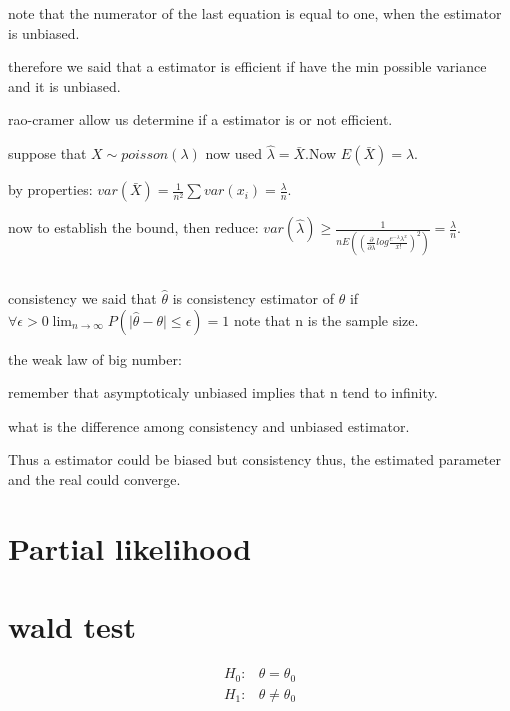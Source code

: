\documentclass[10pt,a4paper]{article}
\begin{document}
note that the numerator of the last equation is equal to one, when the estimator is unbiased.

therefore we said that a estimator is efficient  if have the min possible variance and it is unbiased.

rao-cramer allow us determine if a estimator is or not efficient.


suppose that $X \sim poisson(\lambda)$ 
now used $\hat{\lambda} = \bar{X}$.Now
$E(\bar{X}) = \lambda$.

by properties:
$ var(\bar{X}) = \frac{1}{n^{2}} \sum var(x_{i}) = \frac{\lambda}{n}.$

now to establish the bound, then reduce: 
$var(\hat{\lambda}) \geq \frac{1}{nE \left((\frac{\partial}{\partial \lambda} 
log \frac{e^{-\lambda}\lambda^{x}}{x!})^{2} \right)} =  \frac{\lambda}{n}$.

\\

consistency we said that $\hat{\theta} $ is consistency estimator of $\theta$ if 
$\forall \epsilon > 0 \lim_{n \to \infty}P(\vert \hat{\theta}-\theta \vert \leq \epsilon) =1$
note that n is the sample size.

the weak law of big number:


remember that asymptoticaly unbiased implies that n tend to infinity.


what is the difference among consistency and unbiased estimator.


Thus a estimator could be biased but consistency thus, the estimated parameter and the real could converge.



\section{Partial likelihood}





\section{wald test}

\begin{equation}
\begin{align*}
H_{0} :& \theta  = \theta_{0} \\
H_{1} :& \theta  \neq \theta_{0}
\end{align*}
\end{equation}
\end{document}

